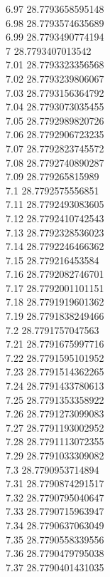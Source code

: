 {6.97	28.7793658595148\\
6.98	28.7793574635689\\
6.99	28.7793490774194\\
7	28.7793407013542\\
7.01	28.7793323356568\\
7.02	28.7793239806067\\
7.03	28.7793156364792\\
7.04	28.7793073035455\\
7.05	28.7792989820726\\
7.06	28.7792906723235\\
7.07	28.7792823745572\\
7.08	28.7792740890287\\
7.09	28.779265815989\\
7.1	28.7792575556851\\
7.11	28.7792493083605\\
7.12	28.7792410742543\\
7.13	28.7792328536023\\
7.14	28.7792246466362\\
7.15	28.779216453584\\
7.16	28.7792082746701\\
7.17	28.7792001101151\\
7.18	28.7791919601362\\
7.19	28.7791838249466\\
7.2	28.7791757047563\\
7.21	28.7791675997716\\
7.22	28.7791595101952\\
7.23	28.7791514362265\\
7.24	28.7791433780613\\
7.25	28.7791353358922\\
7.26	28.7791273099083\\
7.27	28.7791193002952\\
7.28	28.7791113072355\\
7.29	28.7791033309082\\
7.3	28.7790953714894\\
7.31	28.7790874291517\\
7.32	28.7790795040647\\
7.33	28.7790715963947\\
7.34	28.7790637063049\\
7.35	28.7790558339556\\
7.36	28.7790479795038\\
7.37	28.7790401431035\\
}
